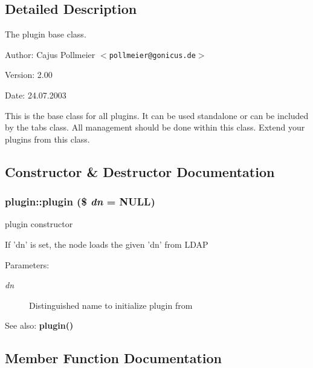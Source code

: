 \subsection{Detailed Description}
The plugin base class. 

\begin{Desc}
\item[Author:]Cajus Pollmeier $<${\tt pollmeier@gonicus.de}$>$ \end{Desc}
\begin{Desc}
\item[Version:]2.00 \end{Desc}
\begin{Desc}
\item[Date:]24.07.2003\end{Desc}
This is the base class for all plugins. It can be used standalone or can be included by the tabs class. All management should be done within this class. Extend your plugins from this class. 



\subsection{Constructor \& Destructor Documentation}
\subsubsection{\setlength{\rightskip}{0pt plus 5cm}plugin::plugin (\$ {\em dn} = NULL)}\label{classplugin_a0}


plugin constructor 

If 'dn' is set, the node loads the given 'dn' from LDAP

\begin{Desc}
\item[Parameters:]
\begin{description}
\item[{\em dn}]Distinguished name to initialize plugin from \end{description}
\end{Desc}
\begin{Desc}
\item[See also:]{\bf plugin()} \end{Desc}


\subsection{Member Function Documentation}
